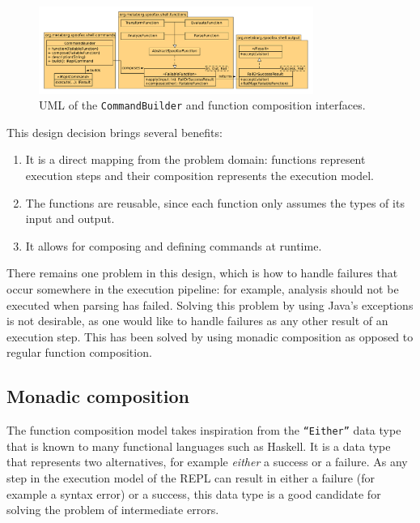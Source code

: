 \begin{figure}[b]
  \centering
  \includegraphics[width=0.8\textwidth]{uml-function-comp}
  \caption{UML of the \texttt{CommandBuilder} and function composition
    interfaces.}
  \label{fig:uml-function-comp}
\end{figure}

This design decision brings several benefits:

\begin{enumerate}
\item It is a direct mapping from the problem domain: functions
  represent execution steps and their composition represents the
  execution model.
\item The functions are reusable, since each function only assumes
  the types of its input and output.
\item It allows for composing and defining commands at runtime.
\end{enumerate}

There remains one problem in this design, which is how to handle
failures that occur somewhere in the execution pipeline: for example,
analysis should not be executed when parsing has failed. Solving this
problem by using Java's exceptions is not desirable, as one would like
to handle failures as any other result of an execution step. This
has been solved by using monadic composition as opposed to regular function
composition.

\subsection{Monadic composition}
\label{sec:monadic-composition}
The function composition model takes inspiration from the \texttt{``Either''}
data type that is known to many functional languages such as
Haskell. It is a data type that represents two alternatives, for
example \textit{either} a success or a failure. As any step in the
execution model of the REPL can result in either a failure (for
example a syntax error) or a success, this data type is a good
candidate for solving the problem of intermediate errors.

